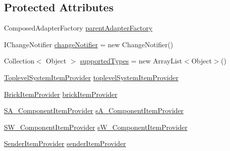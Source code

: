 \subsection*{Protected Attributes}
\begin{DoxyCompactItemize}
\item 
Composed\-Adapter\-Factory \hyperlink{classshootingmachineemfmodel_1_1provider_1_1_shootingmachineemfmodel_item_provider_adapter_factory_aefa932b17c6961fbfbead5540d214176}{parent\-Adapter\-Factory}
\item 
I\-Change\-Notifier \hyperlink{classshootingmachineemfmodel_1_1provider_1_1_shootingmachineemfmodel_item_provider_adapter_factory_acc6bc88e6f012b19c0bb03bc1d36f806}{change\-Notifier} = new Change\-Notifier()
\item 
Collection$<$ Object $>$ \hyperlink{classshootingmachineemfmodel_1_1provider_1_1_shootingmachineemfmodel_item_provider_adapter_factory_add0fefff4b45608069578e21ac84a4ec}{supported\-Types} = new Array\-List$<$Object$>$()
\item 
\hyperlink{classshootingmachineemfmodel_1_1provider_1_1_toplevel_system_item_provider}{Toplevel\-System\-Item\-Provider} \hyperlink{classshootingmachineemfmodel_1_1provider_1_1_shootingmachineemfmodel_item_provider_adapter_factory_a35dd7e0b671c7f06296cde3c2923f2ed}{toplevel\-System\-Item\-Provider}
\item 
\hyperlink{classshootingmachineemfmodel_1_1provider_1_1_brick_item_provider}{Brick\-Item\-Provider} \hyperlink{classshootingmachineemfmodel_1_1provider_1_1_shootingmachineemfmodel_item_provider_adapter_factory_a106658c0a166931fc362f0d208dc170e}{brick\-Item\-Provider}
\item 
\hyperlink{classshootingmachineemfmodel_1_1provider_1_1_s_a___component_item_provider}{S\-A\-\_\-\-Component\-Item\-Provider} \hyperlink{classshootingmachineemfmodel_1_1provider_1_1_shootingmachineemfmodel_item_provider_adapter_factory_a6bf964da7d902c1bcf16405b588c0ae4}{s\-A\-\_\-\-Component\-Item\-Provider}
\item 
\hyperlink{classshootingmachineemfmodel_1_1provider_1_1_s_w___component_item_provider}{S\-W\-\_\-\-Component\-Item\-Provider} \hyperlink{classshootingmachineemfmodel_1_1provider_1_1_shootingmachineemfmodel_item_provider_adapter_factory_a4ca6904ab2b47792a1429a1732de0084}{s\-W\-\_\-\-Component\-Item\-Provider}
\item 
\hyperlink{classshootingmachineemfmodel_1_1provider_1_1_sender_item_provider}{Sender\-Item\-Provider} \hyperlink{classshootingmachineemfmodel_1_1provider_1_1_shootingmachineemfmodel_item_provider_adapter_factory_ac21bc8607365abc11611a860fa96fd0d}{sender\-Item\-Provider}

\end{DoxyCompactItemize}
